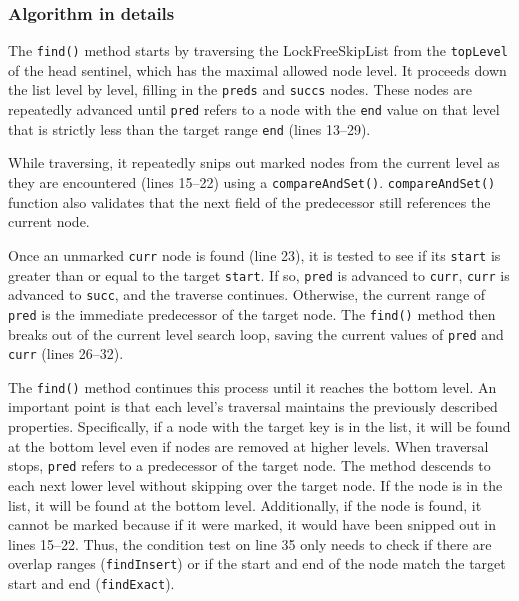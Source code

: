 \vspace{15pt}
\begin{figure}[h]
    \centering
    
\end{figure}

\subsubsection{Algorithm in details}
The \texttt{find()} method starts by traversing the LockFreeSkipList from the \texttt{topLevel} of the head sentinel, which has the maximal allowed node level.
It proceeds down the list level by level, filling in the \texttt{preds} and \texttt{succs} nodes.
These nodes are repeatedly advanced until \texttt{pred} refers to a node with the \texttt{end} value on that level that is strictly less than the target range \texttt{end} (lines 13--29).

While traversing, it repeatedly snips out marked nodes from the current level as they are encountered (lines 15--22) using a \texttt{compareAndSet()}.
\texttt{compareAndSet()} function also validates that the next field of the predecessor still references the current node.

Once an unmarked \texttt{curr} node is found (line 23), it is tested to see if its \texttt{start} is greater than or equal to the target \texttt{start}.
If so, \texttt{pred} is advanced to \texttt{curr}, \texttt{curr} is advanced to \texttt{succ}, and the traverse continues.
Otherwise, the current range of \texttt{pred} is the immediate predecessor of the target node.
The \texttt{find()} method then breaks out of the current level search loop, saving the current values of \texttt{pred} and \texttt{curr} (lines 26--32).

The \texttt{find()} method continues this process until it reaches the bottom level.
An important point is that each level's traversal maintains the previously described properties.
Specifically, if a node with the target key is in the list, it will be found at the bottom level even if nodes are removed at higher levels.
When traversal stops, \texttt{pred} refers to a predecessor of the target node.
The method descends to each next lower level without skipping over the target node.
If the node is in the list, it will be found at the bottom level.
Additionally, if the node is found, it cannot be marked because if it were marked, it would have been snipped out in lines 15--22.
Thus, the condition test on line 35 only needs to check if there are overlap ranges (\texttt{findInsert}) or if the start and end of the node match the target start and end (\texttt{findExact}).

